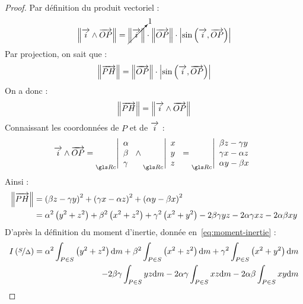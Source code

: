 	\begin{proof}
		Par définition du produit vectoriel :
		\begin{equation*}
			\left\|\overrightarrow{i}\wedge\overrightarrow{OP}\right\|=\cancelto{1}{\left\|\overrightarrow{i}\right\|}\cdot\left\|\overrightarrow{OP}\right\|\cdot\left|\sin\left(\overrightarrow{i},\overrightarrow{OP}\right)\right|
		\end{equation*}
		Par projection, on sait que :
		\begin{equation*}
			\left\|\overrightarrow{PH}\right\|=\left\|\overrightarrow{OP}\right\|\cdot\left|\sin\left(\overrightarrow{i},\overrightarrow{OP}\right)\right| 
		\end{equation*}
		On a donc :
		\begin{equation*}
			\left\|\overrightarrow{PH}\right\|=\left\|\overrightarrow{i}\wedge\overrightarrow{OP}\right\|
		\end{equation*}
		Connaissant les coordonnées de $P$ et de $\overrightarrow{i}$ :
		\begin{equation*}
			\vect{i}\wedge\vect{OP}=
			\coords{\alpha}{\beta}{\gamma}
			\wedge
			\coords{x}{y}{z}
			=
			\coords{\beta z-\gamma y}{\gamma x-\alpha z}{\alpha y-\beta x}
		\end{equation*}
		Ainsi :
		\begin{align*}
			\left\|\overrightarrow{PH}\right\|	&=\left(\beta z-\gamma y\right)^2+\left(\gamma x-\alpha z\right)^2+\left(\alpha y-\beta x\right)^2\\
										&=\alpha^2\left(y^2+z^2\right)+\beta^2\left(x^2+z^2\right)+\gamma^2\left(x^2+y^2\right)-2\beta\gamma yz-2\alpha\gamma xz-2\alpha\beta xy
		\end{align*}
		D'après la définition du moment d'inertie, donnée en~\eqref{eq:moment-inertie} :
		\begin{equation*}
			\begin{split}
				I\left(\nicefrac{S}{\Delta}\right)=
					\alpha^2\int_{P\in S}\left(y^2+z^2\right)\mathrm{d}m
					+\beta^2\int_{P\in S}\left(x^2+z^2\right)\mathrm{d}m
					+\gamma^2\int_{P\in S}\left(x^2+y^2\right)\mathrm{d}m\\
					-2\beta\gamma\int_{P\in S}yz\mathrm{d}m
					-2\alpha\gamma\int_{P\in S}xz\mathrm{d}m
					-2\alpha\beta\int_{P\in S}xy\mathrm{d}m
				\end{split}
		\end{equation*}
	\end{proof}

